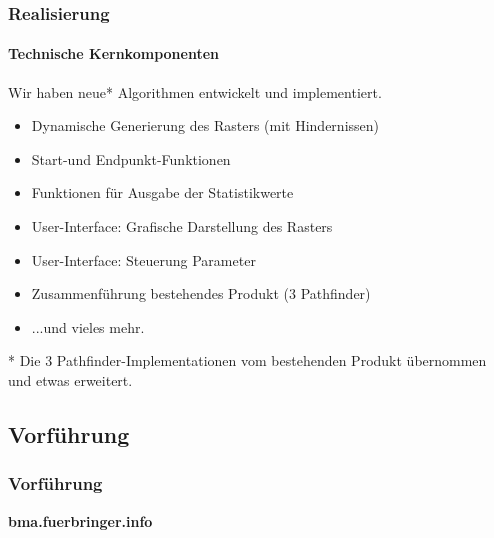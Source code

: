 \documentclass[professionalfont,serif,german]{beamer}
\begin{document}
\begin{frame}
  \frametitle{Realisierung}
  \framesubtitle{Technische Kernkomponenten}
  Wir haben neue* Algorithmen entwickelt und implementiert.
  \begin{itemize}
    \item Dynamische Generierung des Rasters (mit Hindernissen)
    \item Start-und Endpunkt-Funktionen
    \item Funktionen für Ausgabe der Statistikwerte
    \item User-Interface: Grafische Darstellung des Rasters
    \item User-Interface: Steuerung Parameter
    \item Zusammenführung bestehendes Produkt (3 Pathfinder)
    \item ...und vieles mehr.
  \end{itemize}
  \scriptsize{* Die 3 Pathfinder-Implementationen vom bestehenden Produkt übernommen und etwas erweitert.}
\end{frame}

\begin{frame}
  \section[Vorführung]{Vorführung}
  \frametitle{Vorführung}
  \begin{center}
    \textbf{bma.fuerbringer.info}
  \end{center}
\end{frame}
\end{document}
